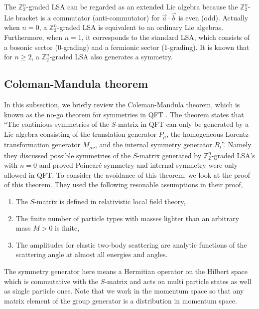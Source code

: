 \documentclass[a4paper,12pt]{article}
\def\Z{\mathbb{Z}}
\theoremstyle{plain}
\theoremstyle{definition}
\begin{document}
The $\Z_2^n$-graded LSA can be regarded as an extended Lie algebra because the $\Z_2^n$-Lie bracket is a commutator (anti-commutator) for $ \vec{a}\cdot\vec{b} $ is even (odd). Actually when $n=0$, a $\Z_2^n$-graded LSA is equivalent to an ordinary Lie algebras. Furthermore, when $n=1$, it corresponds to the standard LSA, which consists of a bosonic sector ($0$-grading) and a fermionic sector ($1$-grading). It is known that for $n\ge 2$, a $\Z_2^n$-graded LSA also generates a symmetry. 
\subsection{Coleman-Mandula theorem}
In this subsection, we briefly review the Coleman-Mandula theorem, which is known as the no-go theorem for symmetries in QFT \cite{J.M, CM}.
The theorem states that
``The continious symmetries of the $S$-matrix in QFT can only be generated by a Lie algebra consisting of the translation generator $P_{\mu}$, the homogeneous Lorentz transformation generator $M_{\mu \nu}$, and the internal symmetry generator $B_l$''. 
Namely they discussed possible symmetries of the $S$-matrix generated by $\Z_2^n$-graded LSA's with $n=0$ and proved Poincar\'e symmetry and internal symmetry were only allowed in QFT. 
To consider the avoidance of this theorem, we look at the proof of this theorem\cite{J.M, S.W}.
They used the following resonable assumptions in their proof,
\begin{enumerate}
\item
The $S$-matrix is defined in relativistic local field theory, 
\item
The finite number of particle types with masses lighter than an arbitrary mass $M > 0$ is finite, 
\item
The amplitudes for elastic two-body scattering are analytic functions of the scattering angle at almost all energies and angles. 
\end{enumerate}
The symmetry generator here means a Hermitian operator on the Hilbert space which is commutative with the $S$-matrix and acts on multi particle states as well as single particle ones.
Note that we work in the momentum space so that any matrix element of the group generator is a distribution in momentum space.
\end{document}
